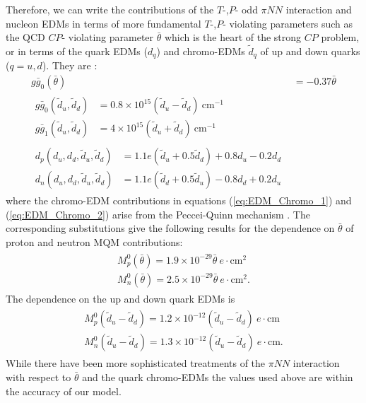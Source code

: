 \documentclass[10pt,a4paper, twoside, openright]{report}
\begin{document}
Therefore, we can write the contributions of the $T$-,$P$- odd $\pi NN$ interaction and nucleon EDMs in terms of more fundamental $T$-,$P$- violating parameters such as the  QCD $CP$- violating parameter $\bar{\theta}$ which is the heart of the strong $CP$ problem,  or in terms of the quark EDMs  ($d_{q}$) and chromo-EDMs $\tilde{d}_{q}$ of up and down quarks ($q=u,d$). They are \cite{ Crewther1979,Pospelov1999, Pospelov2005, Alexandrou2017, JLQCD, PNDME2018}:
\begin{align}
g\bar{g}_0(\bar{\theta})&= -0.37 \bar{\theta} \\
\begin{split}
g\bar{g}_0(\tilde{d}_u, \tilde{d}_d)&= 0.8\times 10^{15} \left(\tilde{d}_u - \tilde{d}_{d}\right) \ \text{cm}^{-1} \\
g\bar{g}_1(\tilde{d}_u, \tilde{d}_d)&= 4\times 10^{15} \left(\tilde{d}_u + \tilde{d}_{d}\right) \ \text{cm}^{-1}
\end{split} \label{eq:EDM_Chromo_1} \\
\begin{split}
d_{p}(d_u, d_d, \tilde{d}_u, \tilde{d}_d) &= 1.1e\left(\tilde{d}_u + 0.5\tilde{d}_{d}\right) + 0.8 d_u - 0.2d_d \\
d_{n}(d_u, d_d, \tilde{d}_u, \tilde{d}_d) &= 1.1e\left(\tilde{d}_d + 0.5\tilde{d}_{u}\right) - 0.8 d_d + 0.2d_u
\end{split} \label{eq:EDM_Chromo_2}
\end{align}
where the chromo-EDM contributions in equations (\ref{eq:EDM_Chromo_1}) and (\ref{eq:EDM_Chromo_2}) arise from the Peccei-Quinn mechanism \cite{Peccei1977, Pospelov2005}. 
The corresponding substitutions give the following results for the dependence on $\bar{\theta}$ of  proton and neutron MQM contributions:
\begin{align}
\begin{split}
M_{p}^0(\bar{\theta}) = 1.9 \times 10^{-29}\bar{\theta} \ e\cdot\text{cm}^2 \\
M_{n}^0(\bar{\theta}) = 2.5 \times 10^{-29}\bar{\theta} \ e\cdot\text{cm}^2.
\end{split}
\end{align}
The dependence  on the up and down quark EDMs is
\begin{align} 
\begin{split}
M_{p}^0(\tilde{d}_u - \tilde{d}_d) = 1.2 \times 10^{-12}(\tilde{d}_u - \tilde{d}_d) \ e\cdot\text{cm} \\
M_{n}^0(\tilde{d}_u - \tilde{d}_d) = 1.3 \times 10^{-12}(\tilde{d}_u - \tilde{d}_d) \ e\cdot\text{cm}. 
\end{split}
\end{align}
While there have been more sophisticated treatments of the  $\pi NN$ interaction with respect to $\bar{\theta}$\cite{Vries2015, Engel2013, Yamanaka2017, Chupp2019} and the quark chromo-EDMs \cite{Fuyuto2013, Seng2018, Engel2013, Yamanaka2017, Chupp2019} the values used above are within the accuracy of our model.  
\end{document}
